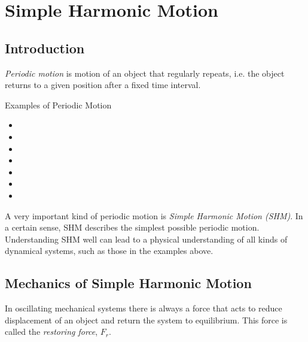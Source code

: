 
\chapter{Simple Harmonic Motion}
\section*{Introduction}
\emph{Periodic motion} is motion of an object that regularly repeats, i.e. the object returns to a given position after a fixed time interval.
\begin{examplebox}{Examples of Periodic Motion}
\begin{itemize}[noitemsep]
\item{}
\item{}
\item{}
\item{}
\item{}
\item{}
\item{}
\end{itemize}
\end{examplebox}
A very important kind of periodic motion is \emph{Simple Harmonic Motion (SHM)}. In a certain sense, SHM describes the simplest possible periodic motion. Understanding SHM well can lead to a physical understanding of all kinds of dynamical systems, such as those in the examples above. 

\section{Mechanics of Simple Harmonic Motion}
In oscillating mechanical systems there is always a force that acts to reduce displacement of an object and return the system to equilibrium. This force is called the \emph{restoring force}, $F_r$.
 
